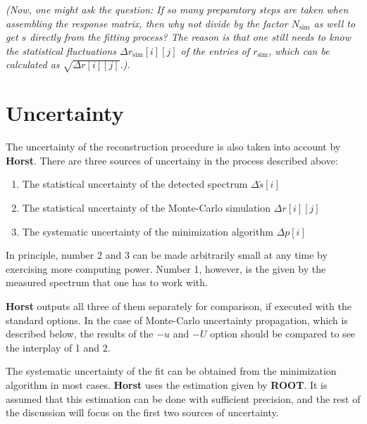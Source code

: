 \documentclass{article}
\begin{document}
\textit{(Now, one might ask the question: If so many preparatory steps are taken when assembling the response matrix, then why not divide by the factor $N_\mathrm{sim}$ as well to get $s$ directly from the fitting process?
The reason is that one still needs to know the statistical fluctuations $\Delta r_\mathrm{sim}[i][j]$ of the entries of $r_\mathrm{sim}$, which can be calculated as $\sqrt{ \Delta r[i][j] }$.).}


\section{Uncertainty}
\label{Uncertainty}

The uncertainty of the reconstruction procedure is also taken into account by \textbf{Horst}.
There are three sources of uncertainy in the process described above:

\begin{enumerate}
	\item The statistical uncertainty of the detected spectrum $\Delta \tilde{s}[i]$
	\item The statistical uncertainty of the Monte-Carlo simulation $\Delta r[i][j]$
	\item The systematic uncertainty of the minimization algorithm $\Delta p[i]$
\end{enumerate}

In principle, number 2 and 3 can be made arbitrarily small at any time by exercising more computing power. 
Number 1, however, is the given by the measured spectrum that one has to work with.

\textbf{Horst} outputs all three of them separately for comparison, if executed with the standard options.
In the case of Monte-Carlo uncertainty propagation, which is described below, the results of the $-u$ and $-U$ option should be compared to see the interplay of 1 and 2.

The systematic uncertainty of the fit can be obtained from the minimization algorithm in most cases.
\textbf{Horst} uses the estimation given by \textbf{ROOT}.
It is assumed that this estimation can be done with sufficient precision, and the rest of the discussion will focus on the first two sources of uncertainty.
\end{document}
